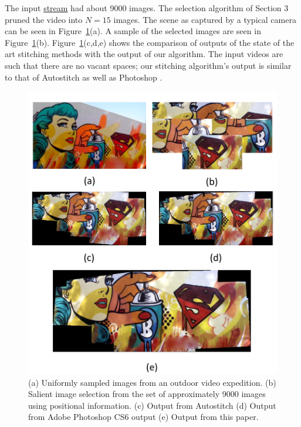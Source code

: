 \documentclass[10pt,twocolumn,letterpaper]{article}
\begin{document}
The input \href{videos/lady2.avi}{stream} had about 9000 images. The
selection algorithm of Section 3 pruned the video into $N=15$ images. The scene as captured by a typical camera 
can  be seen in
Figure~\ref{fig:validResults}(a). A sample of the
selected images are seen in Figure~\ref{fig:validResults}(b).
Figure~\ref{fig:validResults}(c,d,e) shows the comparison of outputs of the state
of the art stitching methods with the output of our algorithm. The input videos
are such that there are no vacant
spaces; our stitching algorithm's output is similar to that of Autostitch
\cite{autostitch} as well as Photoshop \cite{photoshop}.


\begin{figure}[h!]
\centering
\includegraphics[width=0.87\linewidth]{figures/lady2.pdf}
\caption{ (a) Uniformly sampled images from an outdoor video
  expedition.  (b) Salient image selection from the set of
  approximately 9000 images using positional information. (c) Output from
  Autostitch \cite{autostitch} (d) Output from Adobe Photoshop CS6
  \cite{photoshop} output (e) Output from this paper.}
\label{fig:validResults}
\end{figure}
\end{document}
